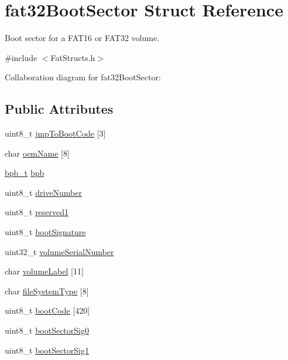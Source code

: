 \hypertarget{structfat32_boot_sector}{}\section{fat32\+Boot\+Sector Struct Reference}
\label{structfat32_boot_sector}


Boot sector for a F\+A\+T16 or F\+A\+T32 volume.  




{\ttfamily \#include $<$Fat\+Structs.\+h$>$}



Collaboration diagram for fat32\+Boot\+Sector\+:
\subsection*{Public Attributes}
\begin{DoxyCompactItemize}
\item 
uint8\+\_\+t \hyperlink{structfat32_boot_sector_ad8c4921d1fcaba0370cff44a27f6f2d1}{jmp\+To\+Boot\+Code} \mbox{[}3\mbox{]}
\item 
char \hyperlink{structfat32_boot_sector_a8516a46b7865715cf0f8f5c39dd96273}{oem\+Name} \mbox{[}8\mbox{]}
\item 
\hyperlink{_fat_structs_8h_a5c8af240713e05e7e6c959006ced35fb}{bpb\+\_\+t} \hyperlink{structfat32_boot_sector_a01848fd44bea48d521bf13dcc8d69c95}{bpb}
\item 
uint8\+\_\+t \hyperlink{structfat32_boot_sector_a625a50384e3a46c5e330d0398c35a898}{drive\+Number}
\item 
uint8\+\_\+t \hyperlink{structfat32_boot_sector_a0a59c59a3f18c1117ffc6a0c25295b9c}{reserved1}
\item 
uint8\+\_\+t \hyperlink{structfat32_boot_sector_a1a06079dbeb74e505689a56ab08c05a7}{boot\+Signature}
\item 
uint32\+\_\+t \hyperlink{structfat32_boot_sector_aa4dffa8748097e02373c33d5f1957b1e}{volume\+Serial\+Number}
\item 
char \hyperlink{structfat32_boot_sector_a327d3769a6a9d172cec163cda30a35ee}{volume\+Label} \mbox{[}11\mbox{]}
\item 
char \hyperlink{structfat32_boot_sector_a2835c957e6b680afded2b5f7e133fd3e}{file\+System\+Type} \mbox{[}8\mbox{]}
\item 
uint8\+\_\+t \hyperlink{structfat32_boot_sector_a7a845a41d575937bb7aac2c5204a6e1d}{boot\+Code} \mbox{[}420\mbox{]}
\item 
uint8\+\_\+t \hyperlink{structfat32_boot_sector_aea26006be62f6bbca4637e359ce85e40}{boot\+Sector\+Sig0}
\item 
uint8\+\_\+t \hyperlink{structfat32_boot_sector_a92816cfa0d97e94c46eaff1ccc92f1fa}{boot\+Sector\+Sig1}
\end{DoxyCompactItemize}


